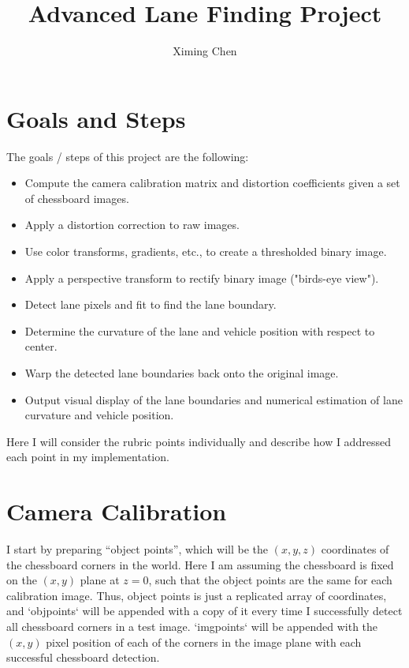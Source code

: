 \documentclass[draftcls,onecolumn,12pt]{IEEEtran}
\theoremstyle{plain}
\theoremstyle{plain}
\begin{document}
\title{Advanced Lane Finding Project}
\author{Ximing Chen}
\maketitle
\section{Goals and Steps}\label{sec:prelim}
The goals / steps of this project are the following:
\begin{itemize}
\item Compute the camera calibration matrix and distortion coefficients given a set of chessboard images.
\item Apply a distortion correction to raw images.
\item Use color transforms, gradients, etc., to create a thresholded binary image.
\item Apply a perspective transform to rectify binary image ("birds-eye view").
\item Detect lane pixels and fit to find the lane boundary.
\item Determine the curvature of the lane and vehicle position with respect to center.
\item Warp the detected lane boundaries back onto the original image.
\item Output visual display of the lane boundaries and numerical estimation of lane curvature and vehicle position.
\end{itemize}

Here I will consider the rubric points individually and describe how I addressed each point in my implementation.  


\section{Camera Calibration}
I start by preparing ``object points'', which will be the $(x, y, z)$ coordinates of the chessboard corners in the world. Here I am assuming the chessboard is fixed on the $(x, y)$ plane at $z=0$, such that the object points are the same for each calibration image. Thus, object points is just a replicated array of coordinates, and `objpoints` will be appended with a copy of it every time I successfully detect all chessboard corners in a test image.  `imgpoints` will be appended with the $(x, y)$ pixel position of each of the corners in the image plane with each successful chessboard detection. 
\end{document}
